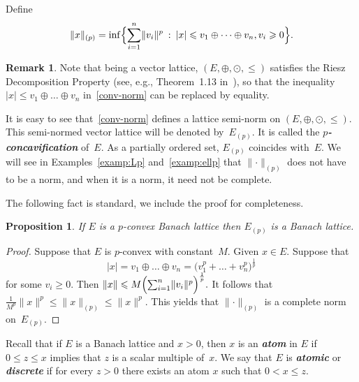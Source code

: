 \documentclass[12pt]{amsart}
\theoremstyle{plain}
\newtheorem{proposition}[theorem]{Proposition}
\theoremstyle{definition}
\newtheorem{remark}[theorem]{Remark}
\newcommand{\abs}[1]{\lvert#1\rvert}
\newcommand{\norm}[1]{\lVert#1\rVert}
\renewcommand{\le}{\leqslant}
\renewcommand{\ge}{\geqslant}
\renewcommand{\mid}{\::\:}
\newcommand{\term}[1]{{\textit{\textbf{#1}}}}
\begin{document}
Define
\begin{equation}\label{conv-norm}
  \norm{x}_{(p)}=\inf\Bigl\{\sum_{i=1}^n \norm{v_i}^p\mid
        \abs{x}\le v_1\oplus\dots\oplus v_n, v_i\ge 0\Bigr\}.
\end{equation}

\begin{remark}\label{conv-norm-eq}
  Note that being a vector lattice, $(E,\oplus,\odot,\le)$ satisfies
  the Riesz Decomposition Property (see, e.g., Theorem~1.13
  in~\cite{Aliprantis:06}), so that the inequality $\abs{x}\le
  v_1\oplus\dots\oplus v_n$ in~\eqref{conv-norm} can be replaced by
  equality.
\end{remark}

It is easy to see that~\eqref{conv-norm} defines a lattice semi-norm
on $(E,\oplus,\odot,\le)$. This semi-normed vector lattice will be
denoted by~$E_{(p)}$. It is called the \term{$p$-concavification}
of~$E$.  As a partially ordered set, $E_{(p)}$ coincides with~$E$.  We
will see in Examples~\ref{examp:Lp} and~\ref{examp:ellp} that
$\norm{\cdot}_{(p)}$ does not have to be a norm, and when it is a
norm, it need not be complete.

The following fact is standard, we include the proof for completeness.

\begin{proposition}\label{p-conv-BL}
  If $E$ is a $p$-convex Banach lattice then $E_{(p)}$ is a Banach lattice.
\end{proposition}

\begin{proof}
  Suppose that $E$ is $p$-convex with constant~$M$. Given $x\in E$.
  Suppose that 
  \begin{displaymath}
      \abs{x}=v_1\oplus\dots\oplus v_n
    =\bigl(v_1^p+\dots+v_n^p\bigr)^{\frac{1}{p}}
  \end{displaymath}
  for some $v_i\ge 0$. Then
  \begin{math}
    \norm{x}
    \le M\Bigl(\sum_{i=1}^n \norm{v_i}^p\Bigr)^{\frac{1}{p}}.
  \end{math}
  It follows that
  $\frac{1}{M^p}\norm{x}^p\le\norm{x}_{(p)}\le\norm{x}^p$. This yields
  that $\norm{\cdot}_{(p)}$ is a complete norm on~$E_{(p)}$.
\end{proof}

Recall that if $E$ is a Banach lattice and $x>0$, then $x$ is an
\term{atom} in $E$ if $0\le z\le x$ implies that $z$ is a scalar
multiple of~$x$. We say that $E$ is \term{atomic} or \term{discrete}
if for every $z>0$ there exists an atom $x$ such that $0<x\le z$. 
\end{document}
